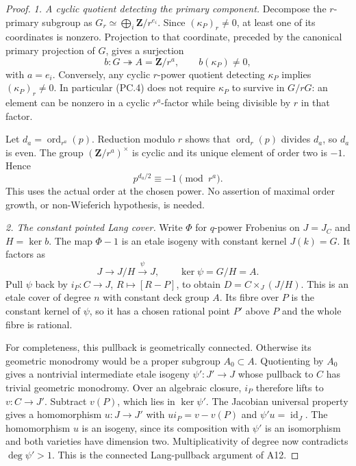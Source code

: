 \begin{proof}
\emph{1. A cyclic quotient detecting the primary component.}
Decompose the $r$-primary subgroup as
$G_r\simeq\bigoplus_i\mathbf Z/r^{e_i}$.
Since $(\kappa_P)_r\ne0$, at least one of its coordinates is
nonzero. Projection to that coordinate, preceded by the canonical
primary projection of $G$, gives a surjection
\[
 b:G\twoheadrightarrow A=\mathbf Z/r^a,
 \qquad b(\kappa_P)\ne0,
 \tag{PC.4}
\]
with $a=e_i$. Conversely, any cyclic $r$-power quotient detecting
$\kappa_P$ implies $(\kappa_P)_r\ne0$.
In particular (PC.4) does not require $\kappa_P$ to survive in
$G/rG$: an element can be nonzero in a cyclic $r^a$-factor while
being divisible by $r$ in that factor.

Let $d_a=\operatorname{ord}_{r^a}(p)$. Reduction modulo $r$
shows that $\operatorname{ord}_r(p)$ divides $d_a$, so $d_a$ is
even. The group $(\mathbf Z/r^a)^\times$ is cyclic and its
unique element of order two is $-1$. Hence
\[
                  p^{d_a/2}\equiv-1\pmod{r^a}.
 \tag{PC.5}
\]
This uses the actual order at the chosen power. No assertion of
maximal order growth, or non-Wieferich hypothesis, is needed.

\emph{2. The constant pointed Lang cover.}
Write $\Phi$ for $q$-power Frobenius on $J=J_C$ and
$H=\ker b$. The map $\Phi-1$ is an etale isogeny with constant
kernel $J(k)=G$. It factors as
\[
 J\longrightarrow J/H\xrightarrow{\psi}J,
 \qquad \ker\psi=G/H=A.
\]
Pull $\psi$ back by $i_P:C\to J$, $R\mapsto[R-P]$, to obtain
$D=C\times_{J}(J/H)$. This is an etale cover of degree $n$ with
constant deck group $A$. Its fibre over $P$ is the constant kernel
of $\psi$, so it has a chosen rational point $P'$ above $P$ and
the whole fibre is rational.

For completeness, this pullback is geometrically connected.
Otherwise its geometric monodromy would be a proper subgroup
$A_0\subset A$. Quotienting by $A_0$ gives a nontrivial intermediate
etale isogeny $\psi':J'\to J$ whose pullback to $C$ has trivial
geometric monodromy. Over an algebraic closure, $i_P$ therefore
lifts to $v:C\to J'$. Subtract $v(P)$, which lies in $\ker\psi'$.
The Jacobian universal property gives a homomorphism $u:J\to J'$
with $u i_P=v-v(P)$ and $\psi'u=\operatorname{id}_J$.
The homomorphism $u$ is an isogeny, since its composition with
$\psi'$ is an isomorphism and both varieties have dimension two.
Multiplicativity of degree now contradicts $\deg\psi'>1$.
This is the connected Lang-pullback argument of A12.


\end{proof}
